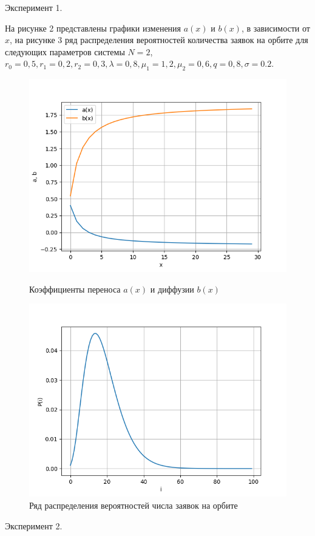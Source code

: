 Эксперимент 1.

На рисунке 2 представлены графики изменения $a(x)$ и $b(x)$, в зависимости от $x$, на рисунке 3 ряд распределения вероятностей количества заявок на орбите для следующих параметров системы $N=2$, $r_{0}=0,5, r_{1}=0,2, r_{2}=0,3, \lambda=0,8, \mu_{1}=1,2, \mu_{2}=0,6 , q=0,8, \sigma=0.2.$

\begin{figure}[H]
	\centering
	\begin{minipage}[h]{0.49\linewidth}
		\includegraphics[width=0.8\linewidth]{ab2} 	
		\caption{Коэффициенты переноса $a(x)$ и диффузии $b(x)$}
		\label{ris:experimoriginal}
	\end{minipage}
	\hfill
	\begin{minipage}[h]{0.49\linewidth}
		\includegraphics[width=0.8\linewidth]{P2} 
		\caption{Ряд распределения вероятностей числа заявок на орбите}
		\label{ris:experimcoded}
	\end{minipage}
\end{figure}
\noindent Эксперимент 2.

